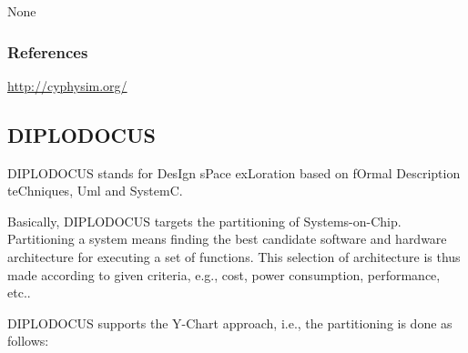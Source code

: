 None


\subsubsection{References}

\url{http://cyphysim.org/}



\subsection{DIPLODOCUS}
\label{subsecT:DIPLODOCUS}


DIPLODOCUS stands for DesIgn sPace exLoration based on fOrmal Description teChniques, Uml and SystemC. 

Basically, DIPLODOCUS targets the partitioning of Systems-on-Chip. Partitioning a system means finding the best candidate software and hardware architecture for executing a set of functions. This selection of architecture is thus made according to given criteria, e.g., cost, power consumption, performance, etc..

DIPLODOCUS supports the Y-Chart approach, i.e., the partitioning is done as follows:


